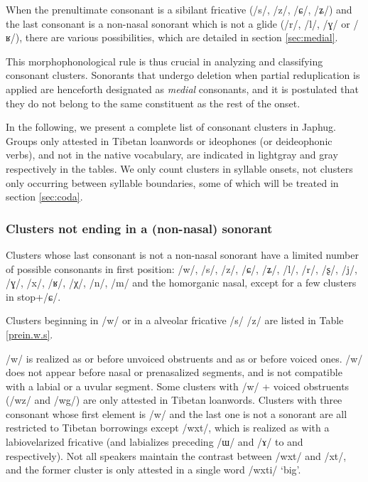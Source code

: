 \documentclass[oneside,a4paper,11pt]{article}
\newcommand{\ipa}[1]{\mbox{\phon/#1/}}
\newcommand{\phonet}[1]{\mbox{\phon[#1]}}
\begin{document}
When the prenultimate consonant is a sibilant fricative   (\ipa{s}, \ipa{z}, \ipa{ɕ}, \ipa{ʑ}) and the last consonant is a non-nasal sonorant which is not a glide (\ipa{r}, \ipa{l}, \ipa{ɣ} or \ipa{ʁ}), there are various possibilities, which are detailed in section \ref{sec:medial}.

This morphophonological rule is thus crucial in analyzing and classifying consonant clusters. Sonorants that undergo deletion when partial reduplication is applied are henceforth designated as \textit{medial} consonants, and it is postulated that they do not belong to the same constituent as the rest of the onset.

In the following, we present a complete list of consonant clusters in Japhug. Groups only attested in Tibetan loanwords or ideophones (or deideophonic verbs), and not in the native vocabulary, are indicated in lightgray and gray respectively in the tables. We only count clusters in syllable onsets, not clusters only occurring between syllable boundaries, some of which will be treated in section \ref{sec:coda}.
  
  
  \subsubsection*{Clusters not ending in a (non-nasal) sonorant}  
Clusters whose last consonant is not a non-nasal sonorant have a limited number of possible consonants in first position: \ipa{w}, \ipa{s}, \ipa{z}, \ipa{ɕ}, \ipa{ʑ}, \ipa{l}, \ipa{r}, \ipa{ʂ}, \ipa{j}, \ipa{ɣ}, \ipa{x}, \ipa{ʁ}, \ipa{χ}, \ipa{n}, \ipa{m} and the homorganic nasal, except for a few clusters in stop+\ipa{ɕ}.

 Clusters beginning in \ipa{w} or in a alveolar fricative \ipa{s} \ipa{z} are listed in Table \ref{prein.w.s}. 
 
\ipa{w} is realized as \phonet{f} or \phonet{ɸ} before unvoiced obstruents and as \phonet{v} or \phonet{β} before voiced ones. \ipa{w} does not appear before nasal or prenasalized segments, and is not compatible with a labial or a uvular segment. Some clusters with \ipa{w} + voiced obstruents (\ipa{wz} and \ipa{wg}) are only attested in Tibetan loanwords. Clusters with three consonant whose first element is \ipa{w} and the last one is not a sonorant are all restricted to Tibetan borrowings except \ipa{wxt}, which is realized as \phonet{xʷt} with a labiovelarized fricative (and labializes preceding \ipa{ɯ} and \ipa{ɤ} to \phonet{u} and \phonet{o} respectively). Not all speakers maintain the contrast between \ipa{wxt} and \ipa{xt}, and the former cluster is only attested in a single word \ipa{wxti} `big'.
 
\end{document}
